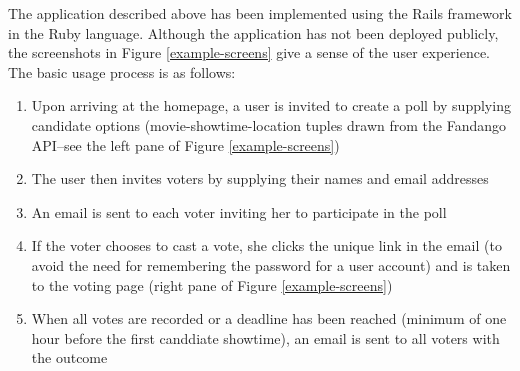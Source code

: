 \documentclass[12pt,letterpaper]{article} %
\begin{document}
The application described above has been implemented using the Rails framework in the Ruby language. Although the application has not been deployed publicly, the screenshots in Figure \ref{example-screens} give a sense of the user experience. The basic usage process is as follows:
\begin{enumerate}
\item Upon arriving at the homepage, a user is invited to create a poll by supplying candidate options (movie-showtime-location tuples drawn from the Fandango API--see the left pane of Figure \ref{example-screens})
\item The user then invites voters by supplying their names and email addresses
\item An email is sent to each voter inviting her to participate in the poll
\item If the voter chooses to cast a vote, she clicks the unique link in the email (to avoid the need for remembering the password for a user account) and is taken to the voting page (right pane of Figure \ref{example-screens})
\item When all votes are recorded or a deadline has been reached (minimum of one hour before the first canddiate showtime), an email is sent to all voters with the outcome
\end{enumerate}
\end{document}
